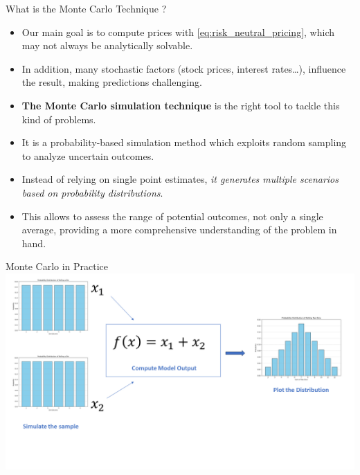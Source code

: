 \documentclass{beamer}
\begin{document}
\begin{frame}{What is the Monte Carlo Technique ?}
\begin{itemize}
	\item Our main goal is to compute prices with \cref{eq:risk_neutral_pricing}, which may not always be analytically solvable.
	\item In addition, many stochastic factors (stock prices, interest rates\ldots), influence the result, making predictions challenging. 
	\item \textbf{The Monte Carlo simulation technique} is the right tool to tackle this kind of  problems.
	\item It is a probability-based simulation method which exploits random sampling to analyze uncertain outcomes.
	\item Instead of relying on single point estimates, \emph{it generates multiple scenarios based on probability distributions}. 
	\item This allows to assess the range of potential outcomes, not only a single average, providing a more comprehensive understanding of the problem in hand.
\end{itemize}
\end{frame}

\begin{frame}{Monte Carlo in Practice}
\includegraphics[width=1.0\linewidth]{images/monte_carlo_simulation}
\end{frame}
\end{document}
